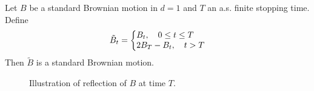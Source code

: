 \documentclass{article}
\begin{document}
\begin{theorem}\label{thm: bm reflection principle}
Let $ B$ be a standard Brownian motion in $ d=1$ and $ T$ an a.s. finite stopping time. Define 
\[
	\tilde{B}_{t} = \left\lbrace
	\begin{array}{@{}l@{}}
	    B_{t}, \quad 0\leq t\leq T \\
	    2B_{T}-B_{t}, \quad t>T
	\end{array}\right.
\]
Then $ \tilde{B}$ is a standard Brownian motion.
\end{theorem}

\begin{figure}[H]
    \centering
    
    \caption{Illustration of reflection of $ B$ at time $ T$. }
    \label{fig: reflection}
\end{figure}
\end{document}
